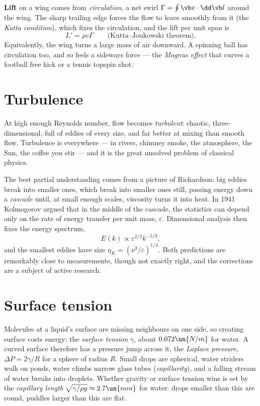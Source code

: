 \textbf{Lift} on a wing comes from \emph{circulation}, a net swirl $\Gamma = \oint\vb v\cdot\dd\vb l$ around the wing. The sharp trailing edge forces the flow to leave smoothly from it (the \emph{Kutta condition}), which fixes the circulation, and the lift per unit span is
\[
  L' = \rho v\Gamma \qquad\text{(Kutta--Joukowski theorem)}.
\]
Equivalently, the wing turns a large mass of air downward. A spinning ball has circulation too, and so feels a sideways force --- the \emph{Magnus effect} that curves a football free kick or a tennis topspin shot.

\section{Turbulence}

At high enough Reynolds number, flow becomes \emph{turbulent}: chaotic, three-dimensional, full of eddies of every size, and far better at mixing than smooth flow. Turbulence is everywhere --- in rivers, chimney smoke, the atmosphere, the Sun, the coffee you stir --- and it is the great unsolved problem of classical physics.

The best partial understanding comes from a picture of Richardson: big eddies break into smaller ones, which break into smaller ones still, passing energy down a \emph{cascade} until, at small enough scales, viscosity turns it into heat. In 1941 Kolmogorov argued that in the middle of the cascade, the statistics can depend only on the rate of energy transfer per unit mass, $\varepsilon$. Dimensional analysis then fixes the energy spectrum,
\[
  E(k)\propto \varepsilon^{2/3}k^{-5/3},
\]
and the smallest eddies have size $\eta_K = (\nu^3/\varepsilon)^{1/4}$. Both predictions are remarkably close to measurements, though not exactly right, and the corrections are a subject of active research.

\section{Surface tension}

Molecules at a liquid's surface are missing neighbours on one side, so creating surface costs energy: the \emph{surface tension} $\gamma$, about $0.072\un{N/m}$ for water. A curved surface therefore has a pressure jump across it, the \emph{Laplace pressure}, $\Delta P = 2\gamma/R$ for a sphere of radius $R$. Small drops are spherical, water striders walk on ponds, water climbs narrow glass tubes (\emph{capillarity}), and a falling stream of water breaks into droplets. Whether gravity or surface tension wins is set by the \emph{capillary length} $\sqrt{\gamma/\rho g}\approx2.7\un{mm}$ for water: drops smaller than this are round, puddles larger than this are flat.

